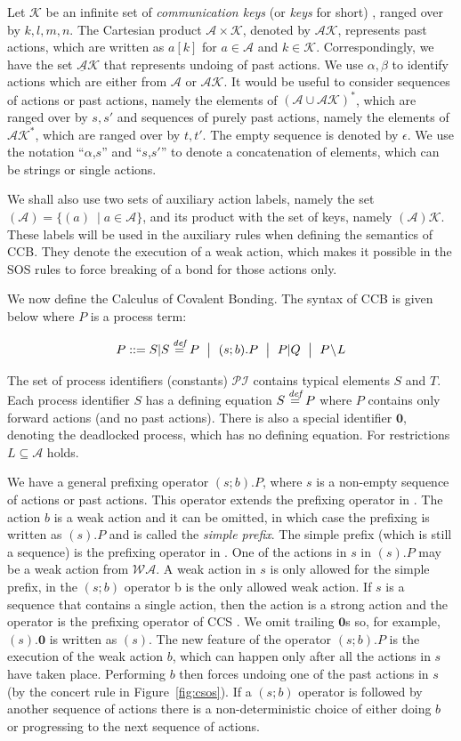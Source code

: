 \documentclass[runningheads]{llncs}
\newcommand{\restrict}[1]{\!\setminus\!#1}
\newcommand{\mA}{\mathcal{A}}
\newcommand{\mWA}{\mathcal{WA}}
\newcommand{\mAK}{\mathcal{AK}}
\newcommand{\umAK}{\underline{\mathcal{A}}\mathcal{K}}
\newcommand{\PI}{\mathcal{PI}}
\newcommand{\Nil}{\mathbf{0}}
\newcommand{\Keys}{\mathcal{K}}
\newcommand{\bydef}{\stackrel{\emph{def}}{=}}
\newcommand{\rulename}[1]{\textsf{#1}}
\begin{document}
Let $\Keys$ be an infinite set of {\em communication keys} (or {\em keys} for short)
\cite{Irek2007}, ranged over by $k,l, m,n$. The Cartesian product $\mathcal A \times \Keys$, denoted by $\mAK$,
 represents past actions, which are written as $a[k]$ for $a\in \mA$ and $k\in\Keys$. 
Correspondingly, we have the set $\umAK$ that represents undoing of past actions. We use $\alpha, \beta$ to identify actions which are either from $\mA$ or $\mAK$. It would be 
useful to consider sequences of actions or past actions, namely the elements of $(\mA \cup \mAK)^*$, 
which are ranged over by $s,s'$ and sequences of purely past actions, namely the elements of $\mAK^*$, 
which are ranged over by $t,t'$. The empty sequence is denoted by $\epsilon$. We use the notation ``$\alpha$,$s$'' and
``$s$,$s'$'' to denote a concatenation of elements, which can be strings or single actions.

We shall also use two sets of auxiliary action labels, namely the set $(\mA) =\{ (a)\ \mid a\in\mA\}$, and its product with the set of keys, namely $(\mA)\Keys$. These labels will be used in the auxiliary rules when defining
the semantics of CCB. They denote the execution of a weak action, which makes it possible in the SOS rules to force breaking of a bond for those actions only.

We now define the Calculus of Covalent Bonding. The syntax of CCB is given 
below where $P$ is a process term:

$$P ::=  S\lvert S\bydef P \ \bigm\lvert \ (s;b).P \ \bigm\lvert \ P\lvert Q \ \bigm\lvert \ P\restrict L $$

The set of process identifiers (constants) $\PI$ contains typical elements $S$ and $T$. 
Each process identifier $S$ has a defining equation $S\bydef P$ where $P$ contains only forward 
actions (and no past actions). There is also a special identifier
 $\Nil$, denoting the deadlocked process, which has no defining equation. For restrictions $L \subseteq \mA$ holds.
 
We have a general prefixing operator
$(s;b).P$, where $s$ is a non-empty sequence of actions or past actions. This operator
extends the prefixing operator in \cite{Irek2012}. The action $b$ is a weak action
and it can be omitted, in which case the prefixing is written as $(s).P$ and is called the
\emph{simple prefix}. The simple prefix (which is still a sequence) is the prefixing operator in \cite{Irek2012}. 
One of the actions in $s$ in $(s).P$ may be a weak action from $\mWA$. A weak action in $s$ is only allowed for the simple prefix, in the $(s;b)$ operator b is the only allowed weak action. If $s$ is a sequence that contains   
a single action, then the action is a strong action and the operator 
is the prefixing operator of CCS \cite{MilnerBook}.
We omit trailing $\Nil$s so, for example, $(s).\Nil$ is written as $(s)$. The new feature of the operator $(s;b).P$ is the execution of the weak action $b$, which
can happen only after all the actions in $s$ have taken place. Performing $b$ then forces
undoing one of the past actions in $s$ (by the \rulename{concert} rule in Figure~\ref{fig:csos}). If a $(s;b)$ operator is followed by another sequence of actions there is a non-deterministic choice of either doing $b$ or progressing to the next sequence of actions.
\end{document}
